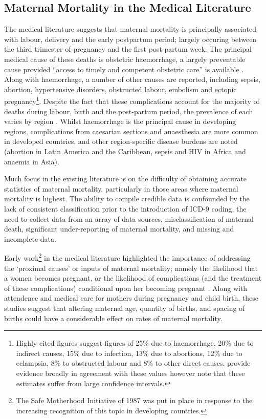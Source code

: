 \documentclass{article}[12pt,subeqn]
\begin{document}
\begin{spacing}{1.4}
\section{Maternal Mortality in the Medical Literature}
\label{scn:medliterature}
The medical literature suggests that maternal mortality is principally 
associated with labour, delivery and the early postpartum period; largely 
occuring between the third trimester of pregnancy and the first post-partum 
week. The principal medical cause of these deaths is obstetric haemorrhage, a 
largely preventable cause provided ``access to timely and competent obstetric 
care'' is available \citep{RonsmansGraham2006}.  Along with haemorrhage, a number 
of other causes are reported, including sepsis, abortion, hypertensive disorders, 
obstructed labour, embolism and ectopic pregnancy\footnote{Highly cited figures 
\citep{WHOetal1991} suggest figures of 25\% due to haemorrhage, 20\% due to 
indirect causes, 15\% due to infection, 13\% due to abortions, 12\% due to 
eclampsia, 8\% to obstructed labour and 8\% to other direct causes. 
\citet{Khanetal2006} provide evidence broadly in agreement with these values 
however note that these estimates suffer from large confidence intervals.}.  
Despite the fact that these complications account for the majority of deaths 
during labour, birth and the post-partum period, the prevalence of each varies 
by region \citep{Khanetal2006}.  Whilst haemorrhage is the principal cause in 
developing regions, complications from caesarian sections and anaesthesia are more 
common in developed countries, and other region-specific disease burdens are noted 
(abortion in Latin America and the Caribbean, sepsis and HIV in Africa and anaemia 
in Asia).

Much focus in the existing literature is on the difficulty of obtaining accurate 
statistics of maternal mortality, particularly in those areas where maternal 
mortality is highest\citep{RonsmansGraham2006, MccarthyMaine1992, 
McAlisterBaskett2006}.  The ability to compile credible data is confounded by the 
lack of consistent classification prior to the introduction of ICD-9 coding, the 
need to collect data from an array of data sources, misclassification of maternal 
death, significant under-reporting of maternal mortality, and missing and 
incomplete data\citep{Yazbeck2007, Hoganetal2010}.

Early work\footnote{The Safe Motherhood Initiative of 1987 was put in place in 
response to the increasing recognition of this topic in developing countries.} 
in the medical literature highlighted the importance of addressing the `proximal 
causes' or inputs of maternal mortality; namely the likelihood that a women 
becomes pregnant, or the likelihood of complications (and the treatment of these 
complications) conditional upon her becoming pregnant \citep{MccarthyMaine1992, 
GoodburnCampbell2001, TrusselPebley1984}.  Along with attendence and medical 
care for mothers during pregnancy and child birth, these studies suggest that 
altering maternal age, quantity of births, and spacing of births could have a 
considerable effect on rates of maternal mortality.  


\end{spacing}
\end{document}
